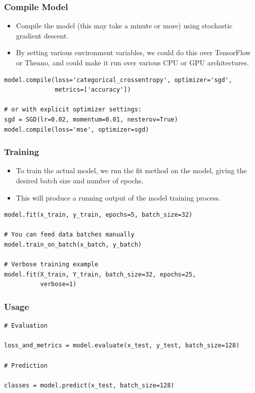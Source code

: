 \begin{frame}[fragile] \frametitle{Compile Model}
\begin{itemize}
\item Compile the model (this may take a minute
or more) using stochastic gradient descent.
\item By setting various environment variables, we could do this
over TensorFlow or Theano, and could make it run over
various CPU or GPU architectures.
\end{itemize}
\begin{lstlisting}
model.compile(loss='categorical_crossentropy', optimizer='sgd',
              metrics=['accuracy'])

# or with explicit optimizer settings:
sgd = SGD(lr=0.02, momentum=0.01, nesterov=True)
model.compile(loss='mse', optimizer=sgd)
\end{lstlisting}
\end{frame}

\begin{frame}[fragile] \frametitle{Training}
\begin{itemize}
\item To train the actual model, we run the fit method on
the model, giving the desired batch size and number
of epochs.
\item This will produce a running output of the model training
process.
\end{itemize}
\begin{lstlisting}
model.fit(x_train, y_train, epochs=5, batch_size=32)

# You can feed data batches manually
model.train_on_batch(x_batch, y_batch)

# Verbose training example
model.fit(X_train, Y_train, batch_size=32, epochs=25,
          verbose=1)
\end{lstlisting}
\end{frame}


\begin{frame}[fragile] \frametitle{Usage}
\begin{lstlisting}
# Evaluation

loss_and_metrics = model.evaluate(x_test, y_test, batch_size=128)

# Prediction

classes = model.predict(x_test, batch_size=128)
\end{lstlisting}

\end{frame}



